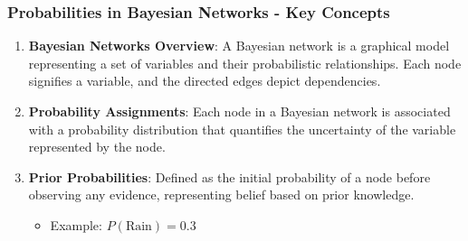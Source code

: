 \documentclass[aspectratio=169]{beamer}
\begin{document}
\begin{frame}[fragile]
    \frametitle{Probabilities in Bayesian Networks - Key Concepts}
    
    \begin{enumerate}
        \item \textbf{Bayesian Networks Overview}:
            A Bayesian network is a graphical model representing a set of variables and their probabilistic relationships. Each node signifies a variable, and the directed edges depict dependencies.
    
        \item \textbf{Probability Assignments}:
            Each node in a Bayesian network is associated with a probability distribution that quantifies the uncertainty of the variable represented by the node.
    
        \item \textbf{Prior Probabilities}:
            Defined as the initial probability of a node before observing any evidence, representing belief based on prior knowledge.
            \begin{itemize}
                \item Example: \( P(\text{Rain}) = 0.3 \)
            \end{itemize}
    \end{enumerate}
\end{frame}
\end{document}
